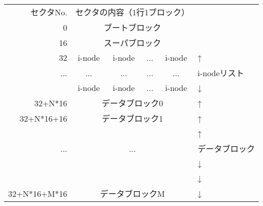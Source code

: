 \documentclass[border=1mm]{standalone}
\begin{document}
\ttfamily\begin{tabular}{r |c | c | c | c| l}
\multicolumn{1}{r}{セクタNo.} &
\multicolumn{4}{c}{セクタの内容（1行1ブロック）} & \\\cline{2-5}
0            & \multicolumn{4}{|c|}{ブートブロック} &             \\\cline{2-5}
16           & \multicolumn{4}{|c|}{スーパブロック} &             \\\cline{2-5}
32           & i-node & i-node & ...    & i-node    & ↑           \\\cline{2-5}
...          &...     & ...    & ...    & ...       & i-nodeリスト\\\cline{2-5}
             & i-node & i-node & ...    & i-node    & ↓           \\\cline{2-5}
32+N*16      & \multicolumn{4}{|c|}{データブロック0}& ↑           \\\cline{2-5}
32+N*16+16   & \multicolumn{4}{|c|}{データブロック1}& ↑           \\\cline{2-5}
             & \multicolumn{4}{|c|}{}               & ↑           \\
   ...       & \multicolumn{4}{|c|}{...}            & データブロック \\
             & \multicolumn{4}{|c|}{}               & ↓           \\
             & \multicolumn{4}{|c|}{}               & ↓           \\\cline{2-5}
32+N*16+M*16 & \multicolumn{4}{|c|}{データブロックM}& ↓           \\\cline{2-5}
\end{tabular}
\end{document}
